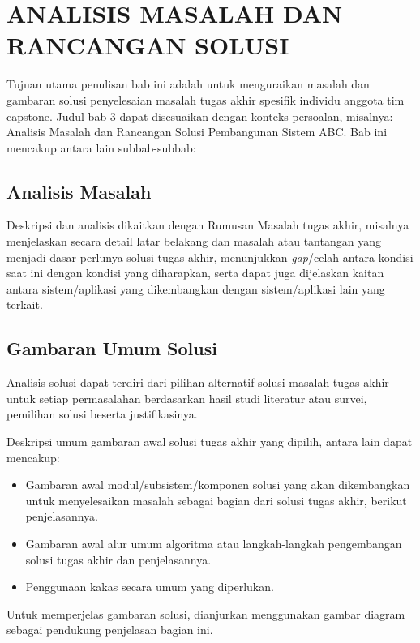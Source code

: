 \chapter{ANALISIS MASALAH DAN RANCANGAN SOLUSI}
\label{chap:analisis-solusi}
\begin{petunjuk}
Tujuan utama penulisan bab ini adalah untuk menguraikan masalah dan gambaran solusi penyelesaian masalah tugas akhir spesifik individu anggota tim capstone. Judul bab 3 dapat disesuaikan dengan konteks persoalan, misalnya: Analisis Masalah dan Rancangan Solusi Pembangunan Sistem ABC. Bab ini mencakup antara lain subbab-subbab:
\end{petunjuk}

\section{Analisis Masalah}
\begin{petunjuk}
Deskripsi dan analisis dikaitkan dengan Rumusan Masalah tugas akhir, misalnya menjelaskan secara detail latar belakang dan masalah atau tantangan yang menjadi dasar perlunya solusi tugas akhir, menunjukkan \textit{gap}/celah antara kondisi saat ini dengan kondisi yang diharapkan, serta dapat juga dijelaskan kaitan antara sistem/aplikasi yang dikembangkan dengan sistem/aplikasi lain yang terkait.
\end{petunjuk}

\section{Gambaran Umum Solusi}
\begin{petunjuk}
Analisis solusi dapat terdiri dari pilihan alternatif solusi masalah tugas akhir untuk setiap permasalahan berdasarkan hasil studi literatur atau survei, pemilihan solusi beserta justifikasinya.

Deskripsi umum gambaran awal solusi tugas akhir yang dipilih, antara lain dapat mencakup:
\begin{itemize}
  \item Gambaran awal modul/subsistem/komponen solusi yang akan dikembangkan untuk menyelesaikan masalah sebagai bagian dari solusi tugas akhir, berikut penjelasannya.
  \item Gambaran awal alur umum algoritma atau langkah-langkah pengembangan solusi tugas akhir dan penjelasannya.
  \item Penggunaan kakas secara umum yang diperlukan.
\end{itemize}
Untuk memperjelas gambaran solusi, dianjurkan menggunakan gambar diagram sebagai pendukung penjelasan bagian ini.
\end{petunjuk}
